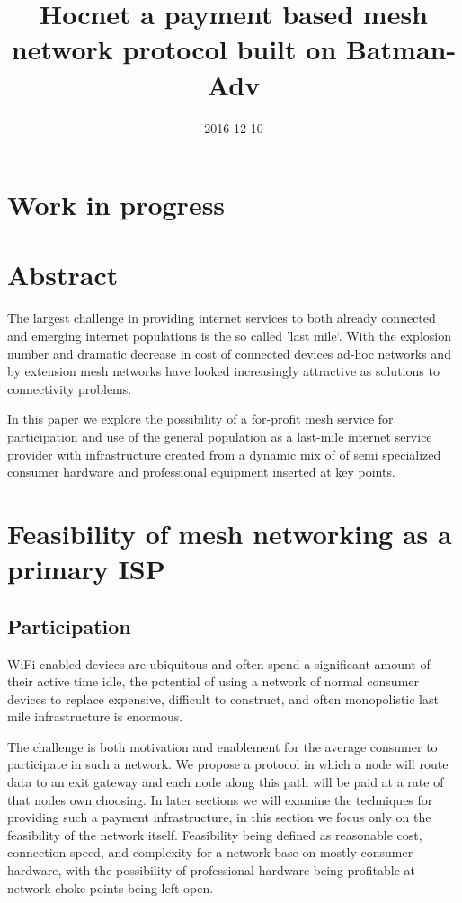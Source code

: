 \documentclass[11pt]{article}
\title{\textbf{Hocnet a payment based mesh network protocol built on Batman-Adv}}
\date{2016-12-10}
\begin{document}
\maketitle

\section{Work in progress}

\tableofcontents

\section{Abstract}

The largest challenge in providing internet services to both already connected and emerging internet populations is the so called 'last mile`. With the explosion number and dramatic decrease in cost of connected devices ad-hoc networks and by extension mesh networks have looked increasingly attractive as solutions to connectivity problems.

In this paper we explore the possibility of a for-profit mesh service for participation and use of the general population as a last-mile internet service provider with infrastructure created from a dynamic mix of of semi specialized consumer hardware and professional equipment inserted at key points.

\section{Feasibility of mesh networking as a primary ISP}

    \subsection{Participation}

    WiFi enabled devices are ubiquitous and often spend a significant amount of their active time idle, the potential of using a network of normal consumer devices to replace expensive, difficult to construct, and often monopolistic last mile infrastructure is enormous.

    The challenge is both motivation and enablement for the average consumer to participate in such a network. We propose a protocol in which a node will route data to an exit gateway and each node along this path will be paid at a rate of that nodes own choosing. In later sections we will examine the techniques for providing such a payment infrastructure, in this section we focus only on the feasibility of the network itself. Feasibility being defined as reasonable cost, connection speed, and complexity for a network base on mostly consumer hardware, with the possibility of professional hardware being profitable at network choke points being left open.
\end{document}

